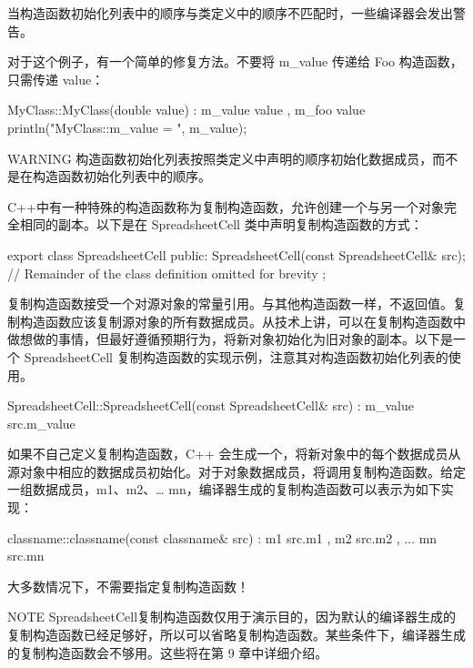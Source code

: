 当构造函数初始化列表中的顺序与类定义中的顺序不匹配时，一些编译器会发出警告。

对于这个例子，有一个简单的修复方法。不要将 m\_value 传递给 Foo 构造函数，只需传递 value：

\begin{cpp}
MyClass::MyClass(double value) : m_value { value }, m_foo { value }
{
    println("MyClass::m_value = {}", m_value);
}
\end{cpp}

\begin{myWarning}{WARNING}
构造函数初始化列表按照类定义中声明的顺序初始化数据成员，而不是在构造函数初始化列表中的顺序。
\end{myWarning}


C++中有一种特殊的构造函数称为复制构造函数，允许创建一个与另一个对象完全相同的副本。以下是在 SpreadsheetCell 类中声明复制构造函数的方式：

\begin{cpp}
export class SpreadsheetCell
{
    public:
        SpreadsheetCell(const SpreadsheetCell& src);
        // Remainder of the class definition omitted for brevity
};
\end{cpp}

复制构造函数接受一个对源对象的常量引用。与其他构造函数一样，不返回值。复制构造函数应该复制源对象的所有数据成员。从技术上讲，可以在复制构造函数中做想做的事情，但最好遵循预期行为，将新对象初始化为旧对象的副本。以下是一个 SpreadsheetCell 复制构造函数的实现示例，注意其对构造函数初始化列表的使用。

\begin{cpp}
SpreadsheetCell::SpreadsheetCell(const SpreadsheetCell& src)
: m_value { src.m_value }
{}
\end{cpp}

如果不自己定义复制构造函数，C++ 会生成一个，将新对象中的每个数据成员从源对象中相应的数据成员初始化。对于对象数据成员，将调用复制构造函数。给定一组数据成员，m1、m2、… mn，编译器生成的复制构造函数可以表示为如下实现：

\begin{cpp}
classname::classname(const classname& src)
: m1 { src.m1 }, m2 { src.m2 }, ... mn { src.mn } { }
\end{cpp}

大多数情况下，不需要指定复制构造函数！

\begin{myNotic}{NOTE}
SpreadsheetCell复制构造函数仅用于演示目的，因为默认的编译器生成的复制构造函数已经足够好，所以可以省略复制构造函数。某些条件下，编译器生成的复制构造函数会不够用。这些将在第 9 章中详细介绍。
\end{myNotic}

